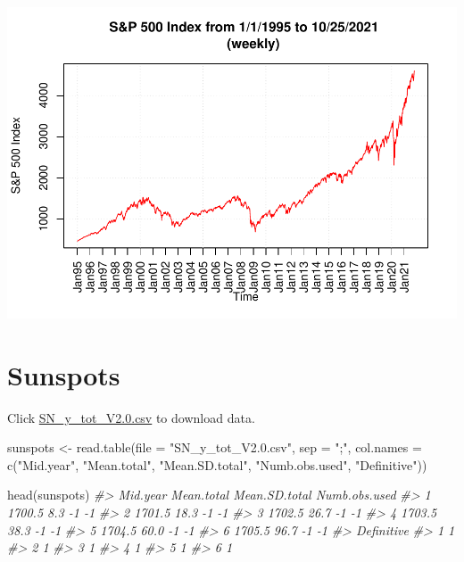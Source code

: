 \documentclass[
]{book}
\newenvironment{Shaded}{\begin{snugshade}}{\end{snugshade}}
\newcommand{\AttributeTok}[1]{\textcolor[rgb]{0.77,0.63,0.00}{#1}}
\newcommand{\CommentTok}[1]{\textcolor[rgb]{0.56,0.35,0.01}{\textit{#1}}}
\newcommand{\FunctionTok}[1]{\textcolor[rgb]{0.00,0.00,0.00}{#1}}
\newcommand{\NormalTok}[1]{#1}
\newcommand{\OtherTok}[1]{\textcolor[rgb]{0.56,0.35,0.01}{#1}}
\newcommand{\StringTok}[1]{\textcolor[rgb]{0.31,0.60,0.02}{#1}}
\begin{document}
\includegraphics{02-Time-Series-Basics_files/figure-latex/unnamed-chunk-16-1.pdf}

\hypertarget{sunspots}{%
\section{Sunspots}\label{sunspots}}

Click \href{http://www.chrisbilder.com/stat878/sections/2/SN_y_tot_V2.0.csv}{SN\_y\_tot\_V2.0.csv} to download data.

\begin{Shaded}
\begin{Highlighting}[]
\NormalTok{sunspots }\OtherTok{\textless{}{-}} \FunctionTok{read.table}\NormalTok{(}\AttributeTok{file =} \StringTok{"SN\_y\_tot\_V2.0.csv"}\NormalTok{, }\AttributeTok{sep =} 
    \StringTok{";"}\NormalTok{, }\AttributeTok{col.names =} \FunctionTok{c}\NormalTok{(}\StringTok{"Mid.year"}\NormalTok{, }\StringTok{"Mean.total"}\NormalTok{, }
   \StringTok{"Mean.SD.total"}\NormalTok{, }\StringTok{"Numb.obs.used"}\NormalTok{, }\StringTok{"Definitive"}\NormalTok{))}
\end{Highlighting}
\end{Shaded}

\begin{Shaded}
\begin{Highlighting}[]
\FunctionTok{head}\NormalTok{(sunspots)}
\CommentTok{\#\textgreater{}   Mid.year Mean.total Mean.SD.total Numb.obs.used}
\CommentTok{\#\textgreater{} 1   1700.5        8.3            {-}1            {-}1}
\CommentTok{\#\textgreater{} 2   1701.5       18.3            {-}1            {-}1}
\CommentTok{\#\textgreater{} 3   1702.5       26.7            {-}1            {-}1}
\CommentTok{\#\textgreater{} 4   1703.5       38.3            {-}1            {-}1}
\CommentTok{\#\textgreater{} 5   1704.5       60.0            {-}1            {-}1}
\CommentTok{\#\textgreater{} 6   1705.5       96.7            {-}1            {-}1}
\CommentTok{\#\textgreater{}   Definitive}
\CommentTok{\#\textgreater{} 1          1}
\CommentTok{\#\textgreater{} 2          1}
\CommentTok{\#\textgreater{} 3          1}
\CommentTok{\#\textgreater{} 4          1}
\CommentTok{\#\textgreater{} 5          1}
\CommentTok{\#\textgreater{} 6          1}
\end{Highlighting}
\end{Shaded}
\end{document}
